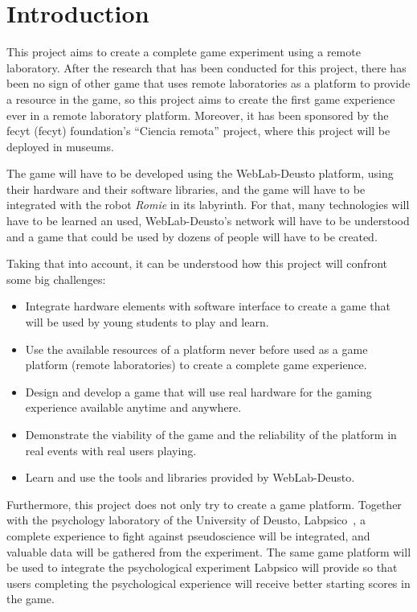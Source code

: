 \chapter{Introduction}

This project aims to create a complete game experiment using a remote laboratory. After the research
that has been conducted for this project, there has been no sign of other game that uses remote
laboratories as a platform to provide a resource in the game, so this project aims to create the
first game experience ever in a remote laboratory platform. Moreover, it has been sponsored by the
\acrshort{fecyt} (\acrlong{fecyt}) foundation's ``Ciencia remota'' project, where this project will
be deployed in museums.

The game will have to be developed using the WebLab-Deusto platform, using their hardware and their
software libraries, and the game will have to be integrated with the robot \emph{Romie} in its
labyrinth. For that, many technologies will have to be learned an used, WebLab-Deusto's network will
have to be understood and a game that could be used by dozens of people will have to be created.

Taking that into account, it can be understood how this project will confront some big challenges:

\begin{itemize}

	\item Integrate hardware elements with software interface to create a game that will be used by
	young students to play and learn.

	\item Use the available resources of a platform never before used as a game platform (remote
	laboratories) to create a complete game experience.

	\item Design and develop a game that will use real hardware for the gaming experience available
	anytime and anywhere.

	\item Demonstrate the viability of the game and the reliability of the platform in real events
	with real users playing.

	\item Learn and use the tools and libraries provided by WebLab-Deusto.

\end{itemize}

Furthermore, this project does not only try to create a game platform. Together with the psychology
laboratory of the University of Deusto, Labpsico~\cite{labpsico_web}, a complete experience to fight
against pseudoscience will be integrated, and valuable data will be gathered from the experiment.
The same game platform will be used to integrate the psychological experiment Labpsico will provide
so that users completing the psychological experience will receive better starting scores in the
game.

